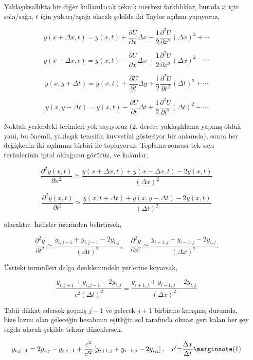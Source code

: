 \documentclass[12pt,fleqn]{article}\usepackage{../../common}
\begin{document}
Yaklaşıksallıkta bir diğer kullanılacak teknik merkezi farklılıklar, burada $x$
için sola/sağa, $t$ için yukarı/aşağı olacak şekilde iki Taylor açılımı
yapıyoruz,


$$
y(x +\Delta x, t)  = y(x,t) +
\frac{\partial U}{\partial x}\Delta x + \frac{1}{2}
\frac{\partial^2 U}{\partial x^2}(\Delta x)^2 + \cdots
$$

$$
y(x -\Delta x, t)  = y(x,t) -
\frac{\partial U}{\partial x} \Delta x + \frac{1} {2}
\frac{\partial^2 U}{\partial x^2} (\Delta x)^2 - \cdots
$$

$$
y(x, y +\Delta t)  = y(x,t) +
\frac{\partial U}{\partial t}\Delta y + \frac{1}{2}
\frac{\partial^2 U}{\partial t^2}(\Delta t)^2 + \cdots
$$

$$
y(x, y -\Delta t) = y(x,t) -
\frac{\partial U}{\partial t} \Delta t + \frac{1} {2}
\frac{\partial^2 U}{\partial t^2} (\Delta t)^2 - \cdots
$$

Noktalı yerlerdeki terimleri yok sayıyoruz (2. derece yaklaşıklama yapmış olduk
yani, bu önemli, yaklaşık temsilin kuvvetini gösteriyor bir anlamda), sonra her
değişkenin iki açılımını birbiri ile topluyoruz. Toplama sonrası tek sayı
terimlerinin iptal olduğunu görürüz, ve kalanlar,

$$
\frac{\partial^2 y(x,t)}{\partial x^2} \simeq
\frac{y(x+\Delta x,t)+y(x-\Delta x,t)-2 y(x,t)}{(\Delta x)^2}
$$

$$
\frac{\partial^2 y(x,t)}{\partial t^2} \simeq
\frac{y(x,t+\Delta t) +y(x, y-\Delta t)-2 y(x,t)}{(\Delta t)^2}
$$

olacaktır. İndisler üzerinden belirtirsek,

$$
\frac{\partial^2 y }{\partial t^2} \simeq
\frac{y_{i,j+1}+y_{i,j-1}-2 y_{i,j}}{(\Delta t)^2}, \quad
\frac{\partial^2 y}{\partial x^2} \simeq
\frac{y_{i+1,j}+y_{i-1,j}-2 y_{i,j}} {(\Delta x)^2}.
$$

Üstteki formülleri dalga denklemindeki yerlerine koyarsak,

$$
\frac{y_{i,j+1}+y_{i,j-1}-2 y_{i,j}} {c^2 (\Delta t)^2}  =
\frac{y_{i+1,j}+y_{i-1,j}-2 y_{i,j}} {(\Delta x)^2}
$$

Tabii dikkat edersek geçmiş $j-1$ ve gelecek $j+1$ birbirine karışmış durumda,
bize lazım olan geleceğin hesabının eşitliğin sol tarafında olması geri kalan
her şey sağda olacak şekilde tekrar düzenlersek,

$$
y_{i,j+1}  = 2 y_{i,j}-y_{i,j-1}+ \frac{c^2 } {c'^{2}}
\left [ y_{i+1,j}+y_{i-1,j}-2 y_{i,j}\right], \quad c' { = }
\frac {\Delta x}{\Delta t}
\mlabel{1}
$$
\end{document}
